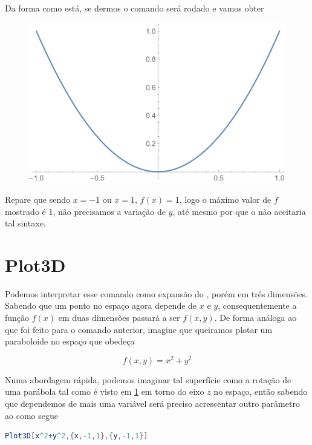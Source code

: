 \documentclass[a4paper, 12pt]{article}
\begin{document}
	Da forma como está, se dermos  o comando será rodado e vamos obter
	
	\begin{figure}[!h]\label{parabola}
		\centering
		\includegraphics[scale=.5]{images/parabola}
	\end{figure}

	Repare que sendo $x=-1$ ou $x=1$, $f(x)=1$, logo o máximo valor de $f$ mostrado é 1, não precisamos a variação de $y$, até mesmo por que o  não aceitaria tal sintaxe. 
	
	\section{Plot3D}
	Podemos interpretar esse comando como expansão do , porém em três dimensões. Sabendo que um ponto no espaço agora depende de $x$ e $y$, consequentemente a função $f(x)$ em duas dimensões passará a ser $f(x,y)$. De forma análoga ao que foi feito para o comando anterior, imagine que queiramos plotar um paraboloide no espaço que obedeça
	
	\begin{equation}
		f(x,y)=x^2+y^2
	\end{equation}
	
	Numa abordagem rápida, podemos imaginar tal superfície como a rotação de uma parábola tal como é visto em \ref{parabola} em torno do eixo $z$ no espaço, então sabendo que dependemos de mais uma variável será preciso acrescentar outro parâmetro ao  como segue
	
	\begin{lstlisting}[language=Mathematica]
	Plot3D[x^2+y^2,{x,-1,1},{y,-1,1}]
	\end{lstlisting}
	
\end{document}
